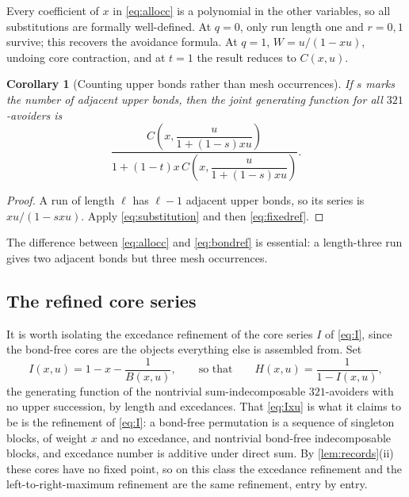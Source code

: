 \documentclass[11pt,letterpaper]{article}
\numberwithin{equation}{section}
\newtheorem{corollary}[theorem]{Corollary}
\theoremstyle{definition}
\begin{document}
Every coefficient of $x$ in \eqref{eq:allocc} is a polynomial in the
other variables, so all substitutions are formally well-defined.
At $q=0$, only run length one and $r=0,1$ survive; this recovers the
avoidance formula. At $q=1$, $W=u/(1-xu)$, undoing core contraction,
and at $t=1$ the result reduces to $C(x,u)$.

\begin{corollary}[Counting upper bonds rather than mesh occurrences]
If $s$ marks the number of adjacent upper bonds, then the joint generating
function for all $321$-avoiders is
\begin{equation}
 \frac{C\!\left(x,\dfrac{u}{1+(1-s)xu}\right)}
 {1+(1-t)x\,C\!\left(x,\dfrac{u}{1+(1-s)xu}\right)}.
 \label{eq:bondref}
\end{equation}
\end{corollary}
\begin{proof}
A run of length $\ell$ has $\ell-1$ adjacent upper bonds, so its series
is $xu/(1-sxu)$. Apply \eqref{eq:substitution} and then
\eqref{eq:fixedref}.
\end{proof}
The difference between \eqref{eq:allocc} and \eqref{eq:bondref} is
essential: a length-three run gives two adjacent bonds but three mesh
occurrences.

\subsection*{The refined core series}

It is worth isolating the excedance refinement of the core series $I$ of
\eqref{eq:I}, since the bond-free cores are the objects everything else
is assembled from. Set
\begin{equation}
 I(x,u)=1-x-\frac1{B(x,u)},
 \qquad\text{so that}\qquad
 H(x,u)=\frac1{1-I(x,u)},
 \label{eq:Ixu}
\end{equation}
the generating function of the nontrivial sum-indecomposable
$321$-avoiders with no upper succession, by length and excedances.
That \eqref{eq:Ixu} is what it claims to be is the refinement of
\eqref{eq:I}: a bond-free permutation is a sequence of singleton blocks,
of weight $x$ and no excedance, and nontrivial bond-free indecomposable
blocks, and excedance number is additive under direct sum.
By \cref{lem:records}(ii) these cores have no fixed point, so on
this class the excedance refinement and the left-to-right-maximum
refinement are the same refinement, entry by entry.
\end{document}
